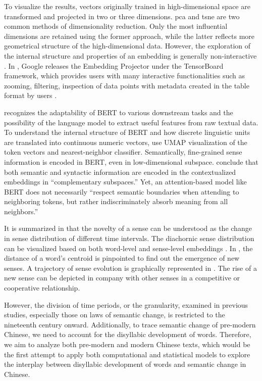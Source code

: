To visualize the results, vectors originally trained in high-dimensional space are transformed and projected in two or three dimensions. \gls{pca} and \gls{tsne} \parencite{vandermaaten2008tsne} are two common methods of dimensionality reduction. Only the most influential dimensions are retained using the former approach, while the latter reflects more geometrical structure of the high-dimensional data. However, the exploration of the internal structure and properties of an embedding is generally non-interactive \parencite{smilkov2016projector}. In \cite*{smilkov2016projector}, Google releases the Embedding Projector under the TensorBoard framework, which provides users with many interactive functionalities such as zooming, filtering, inspection of data points with metadata created in the table format by users \parencite{smilkov2016projector}.

\textcite{coenen2019visualizing} recognizes the adaptability of BERT to various downstream tasks and the possibility of the language model to extract useful features from raw textual data. To understand the internal structure of BERT and how discrete linguistic units are translated into continuous numeric vectors, \textcite{coenen2019visualizing} use UMAP visualization of the token vectors and nearest-neighbor classifier. Semantically, fine-grained sense information is encoded in BERT, even in low-dimensional subspace. \textcite{coenen2019visualizing} conclude that both semantic and syntactic information are encoded in the contextualized embeddings in ``complementary subspaces.'' Yet, an attention-based model like BERT does not necessarily ``respect semantic boundaries when attending to neighboring tokens, but rather indiscriminately absorb meaning from all neighbors.'' \parencite{coenen2019visualizing}

It is summarized in \textcite{tang2018state} that the novelty of a sense can be understood as the change in sense distribution of different time intervals. The diachornic sense distribution can be visualized based on both word-level and sense-level embeddings \parencite{dubossarsky2015bottom,hu2019diachronic}. In \textcite{dubossarsky2015bottom}, the distance of a word's centroid is pinpointed to find out the emergence of new senses. A trajectory of sense evolution is graphically represented in \textcite{hu2019diachronic}. The rise of a new sense can be depicted in company with other senses in a competitive or cooperative relationship.

However, the division of time periods, or the granularity, examined in previous studies,
especially those on laws of semantic change, is restricted to the nineteenth century onward.
Additionally, to trace semantic change of pre-modern Chinese, we need to account for the
disyllabic development of words. Therefore, we aim to analyze both pre-modern and modern
Chinese texts, which would be the first attempt to apply both computational and statistical
models to explore the interplay between disyllabic development of words and semantic change
in Chinese.

